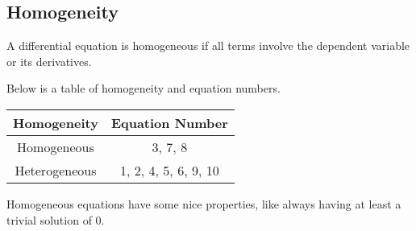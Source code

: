 \subsection{Homogeneity}
\begin{definition}
	A differential equation is homogeneous if all terms involve the dependent variable or its derivatives.
\end{definition}

\noindent
Below is a table of homogeneity and equation numbers.
\begin{table}[H]
	\centering
	\begin{tabular}{c|c}
		Homogeneity & Equation Number \\
		\hline
		Homogeneous &  3, 7, 8 \\
		Heterogeneous & 1, 2, 4, 5, 6, 9, 10 \\
	\end{tabular}
\end{table}
\noindent
Homogeneous equations have some nice properties, like always having at least a trivial solution of 0.